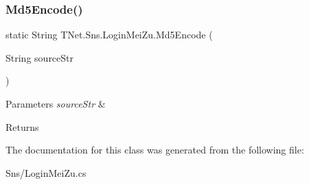 \subsubsection{\texorpdfstring{Md5\+Encode()}{Md5Encode()}}
{\footnotesize\ttfamily static String T\+Net.\+Sns.\+Login\+Mei\+Zu.\+Md5\+Encode (\begin{DoxyParamCaption}\item[{String}]{source\+Str }\end{DoxyParamCaption})\hspace{0.3cm}{\ttfamily [static]}}






\begin{DoxyParams}{Parameters}
{\em source\+Str} & \\
\hline
\end{DoxyParams}
\begin{DoxyReturn}{Returns}

\end{DoxyReturn}


The documentation for this class was generated from the following file\+:\begin{DoxyCompactItemize}
\item 
Sns/Login\+Mei\+Zu.\+cs\end{DoxyCompactItemize}
